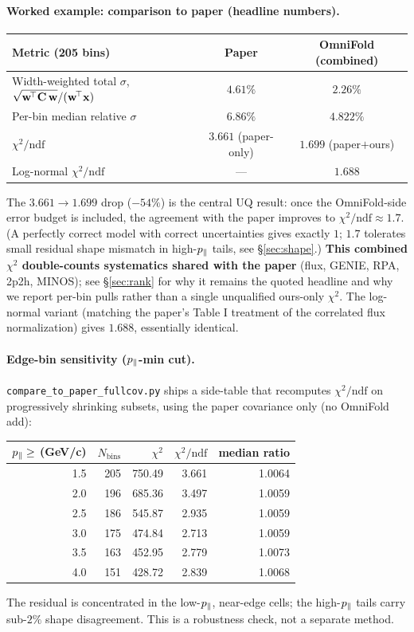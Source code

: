 \paragraph{Worked example: comparison to paper (headline numbers).}
\begin{center}
\begin{tabular}{@{}lcc@{}}
\toprule
Metric (205 bins) & Paper & OmniFold (combined) \\
\midrule
Width-weighted total $\sigma$, $\sqrt{\mathbf{w}^{\!\top}\mathbf{C}\,\mathbf{w}}/(\mathbf{w}^{\!\top}\mathbf{x})$ & $4.61\%$ & $2.26\%$ \\
Per-bin median relative $\sigma$ & $6.86\%$ & $4.822\%$ \\
$\chi^{2}/\mathrm{ndf}$ & $3.661$ (paper-only) & $\boxed{1.699}$ (paper$+$ours) \\
Log-normal $\chi^{2}/\mathrm{ndf}$ & --- & $1.688$ \\
\bottomrule
\end{tabular}
\end{center}
The $3.661 \to 1.699$ drop ($-54\%$) is the central UQ
result: once the OmniFold-side error budget is included,
the agreement with the paper improves to $\chi^{2}/\mathrm{ndf}
\approx 1.7$. (A perfectly correct model with correct uncertainties
gives exactly $1$; $1.7$ tolerates small residual shape mismatch in
high-$p_{\parallel}$ tails, see \S\ref{sec:shape}.) \textbf{This combined
$\chi^{2}$ double-counts systematics shared with the paper} (flux,
GENIE, RPA, 2p2h, MINOS); see \S\ref{sec:rank} for why it remains the
quoted headline and why we report per-bin pulls rather than a single
unqualified ours-only $\chi^{2}$.
The log-normal variant (matching the paper's Table I treatment of the
correlated flux normalization) gives $1.688$, essentially identical.

\paragraph{Edge-bin sensitivity ($p_{\parallel}$-min cut).}
\texttt{compare\_to\_paper\_fullcov.py} ships a side-table that
recomputes $\chi^{2}/\mathrm{ndf}$ on progressively shrinking subsets,
using the paper covariance only (no OmniFold add):
\begin{center}
\begin{tabular}{@{}rrrrr@{}}
\toprule
$p_{\parallel} \ge$ (GeV/c) & $N_{\text{bins}}$ & $\chi^{2}$ & $\chi^{2}/\mathrm{ndf}$ & median ratio \\
\midrule
1.5 & 205 & 750.49 & 3.661 & 1.0064 \\
2.0 & 196 & 685.36 & 3.497 & 1.0059 \\
2.5 & 186 & 545.87 & 2.935 & 1.0059 \\
3.0 & 175 & 474.84 & 2.713 & 1.0059 \\
3.5 & 163 & 452.95 & 2.779 & 1.0073 \\
4.0 & 151 & 428.72 & 2.839 & 1.0068 \\
\bottomrule
\end{tabular}
\end{center}
The residual is concentrated in the low-$p_{\parallel}$, near-edge cells; the
high-$p_{\parallel}$ tails carry sub-$2\%$ shape disagreement. This is a
robustness check, not a separate method.

